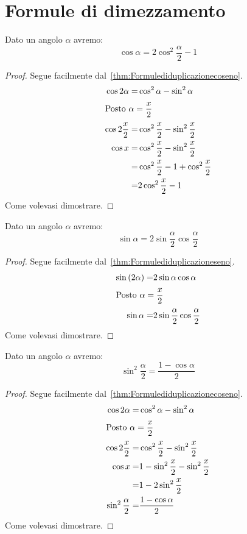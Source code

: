 \section{Formule di dimezzamento}
\begin{cor}\label{cor:Cosenoangolometa}
	Dato un angolo $\alpha$ avremo:
	\[\cos\alpha=2\cos^2\dfrac{\alpha}{2}-1\]
\end{cor}
\begin{proof}
	Segue facilmente dal~\vref{thm:Formulediduplicazionecoseno}. 
	\begin{align*}
		\cos 2\alpha=&\cos^2\alpha-\sin^2\alpha\\
		\intertext{Posto $\alpha=\dfrac{x}{2}$}
		\cos 2\dfrac{x}{2}=&\cos^2\dfrac{x}{2}-\sin^2\dfrac{x}{2}\\
		\cos x=&\cos^2\dfrac{x}{2}-\sin^2\dfrac{x}{2}\\
		=&\cos^2\dfrac{x}{2}- 1+\cos^2\dfrac{x}{2}\\
		=&2\cos^2\dfrac{x}{2}- 1\\
	\end{align*}
	Come volevasi dimostrare.
\end{proof}
\begin{cor}\label{cor:Senoangolometa}
	Dato un angolo $\alpha$ avremo:
	\[\sin\alpha=2\sin\dfrac{\alpha}{2}\cos\dfrac{\alpha}{2}\]
\end{cor}
\begin{proof}
	Segue facilmente dal~\vref{thm:Formulediduplicazioneseno}.
	\begin{align*}
		\sin\left(2\alpha\right)=&2\sin\alpha\cos\alpha\\
		\intertext{Posto $\alpha=\dfrac{x}{2}$}
		\sin\alpha=&2\sin\dfrac{\alpha}{2}\cos\dfrac{\alpha}{2}
	\end{align*}
	Come volevasi dimostrare.
\end{proof}
\begin{cor}\label{cor:Senoangolometacoseno}
	Dato un angolo $\alpha$ avremo:
	\[\sin^2\dfrac{\alpha}{2}=\dfrac{1-\cos\alpha}{2}\]
\end{cor}
\begin{proof}
	Segue facilmente dal~\vref{thm:Formulediduplicazionecoseno}. 
	\begin{align*}
		\cos 2\alpha=&\cos^2\alpha-\sin^2\alpha\\
		\intertext{Posto $\alpha=\dfrac{x}{2}$}
		\cos 2\dfrac{x}{2}=&\cos^2\dfrac{x}{2}-\sin^2\dfrac{x}{2}\\
		\cos x=&1-\sin^2\dfrac{x}{2}-\sin^2\dfrac{x}{2}\\
		=&1-2\sin^2\dfrac{x}{2}\\
		\sin^2\dfrac{\alpha}{2}=&\dfrac{1-\cos\alpha}{2}
	\end{align*}
	Come volevasi dimostrare.
\end{proof}
